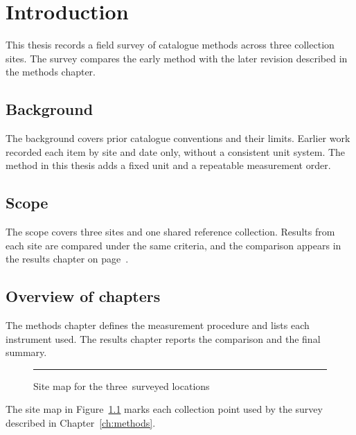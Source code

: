 \chapter{Introduction}\label{ch:intro}
This thesis records a field survey of catalogue methods across three
collection sites. The survey compares the early method with the later
revision described in the methods chapter.

\section{Background}\label{sec:background}
The background covers prior catalogue conventions and their limits.
Earlier work recorded each item by site and date only, without a
consistent unit system. The method in this thesis adds a fixed unit
and a repeatable measurement order.

\section{Scope}\label{sec:scope}
The scope covers three sites and one shared reference collection.
Results from each site are compared under the same criteria, and the
comparison appears in the results chapter on page~\pageref{ch:results}.

\section{Overview of chapters}\label{sec:overview}
The methods chapter defines the measurement procedure and lists each
instrument used. The results chapter reports the comparison and the
final summary.

\begin{figure}[ht!]
  \rule{3cm}{3cm}
  \caption{Site map for the three~surveyed locations}
  \label{fig:sitemap}
\end{figure}

The site map in Figure~\ref{fig:sitemap} marks each collection point
used by the survey described in Chapter~\ref{ch:methods}.
